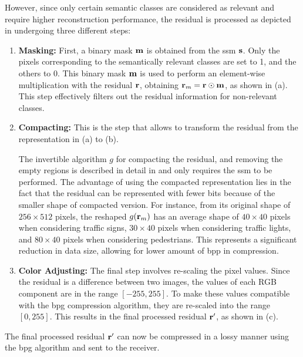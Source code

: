 However, since only certain semantic classes are considered as relevant and require higher reconstruction performance, the residual is processed as depicted in  undergoing three different steps:

\begin{enumerate}
    \item \textbf{Masking:} First, a binary mask $\mathbf{m}$ is obtained from the \gls{ssm} $\mathbf{s}$. Only the pixels corresponding to the semantically relevant classes are set to 1, and the others to 0. This binary mask $\mathbf{m}$ is used to perform an element-wise multiplication with the residual $\mathbf{r}$, obtaining $\mathbf{r}_m = \mathbf{r} \odot \mathbf{m}$, as shown in (a). This step effectively filters out the residual information for non-relevant classes.

    \item \textbf{Compacting:} This is the step that allows to transform the residual from the representation in (a) to (b). 
    
    The invertible algorithm $g$ for compacting the residual, and removing the empty regions is described in detail in  and only requires the \gls{ssm} to be performed. The advantage of using the compacted representation lies in the fact that the residual can be represented with fewer bits because of the smaller shape of compacted version. For instance, from its original shape of $256 \times 512$ pixels, the reshaped $g(\mathbf{r}_m)$ has an average shape of $40 \times 40$ pixels when considering traffic signs, $30 \times 40$ pixels when considering traffic lights, and $80 \times 40$ pixels when considering pedestrians. This represents a significant reduction in data size, allowing for lower amount of \gls{bpp} in compression.

    \item \textbf{Color Adjusting:} The final step involves re-scaling the pixel values. Since the residual is a difference between two images, the values of each RGB component are in the range $[-255, 255]$. To make these values compatible with the \gls{bpg} compression algorithm, they are re-scaled into the range $[0, 255]$. This results in the final processed residual $\mathbf{r}'$, as shown in (c).
\end{enumerate}

The final processed residual $\mathbf{r}'$ can now be compressed in a lossy manner using the \gls{bpg} algorithm and sent to the receiver.

